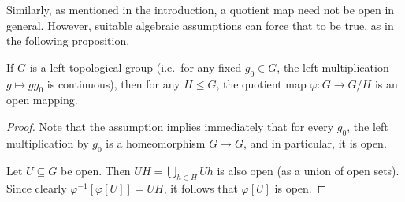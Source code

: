 	Similarly, as mentioned in the introduction, a quotient map need not be open in general. However, suitable algebraic assumptions can force that to be true, as in the following proposition.
	\begin{prop}
		\label{prop:quotient_is_open}
		If $G$ is a left topological group (i.e.\ for any fixed $g_0\in G$, the left multiplication $g\mapsto gg_0$ is continuous), then for any $H\leq G$, the quotient map $\varphi\colon G\to G/H$ is an open mapping.
	\end{prop}
	\begin{proof}
		Note that the assumption implies immediately that for every $g_0$, the left multiplication by $g_0$ is a homeomorphism $G\to G$, and in particular, it is open.
		
		Let $U\subseteq G$ be open. Then $UH=\bigcup_{h\in H} Uh$ is also open (as a union of open sets). Since clearly $\varphi^{-1}[\varphi[U]]=UH$, it follows that $\varphi[U]$ is open.
	\end{proof}
	
